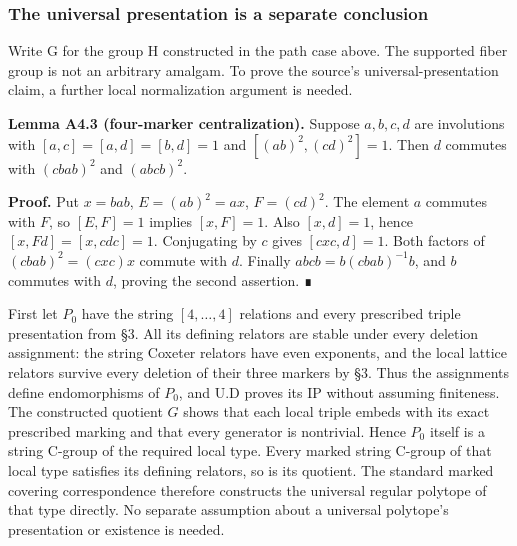 \documentclass[
  11pt,
  a4paper,
]{article}
\begin{document}
\subsubsection{The universal presentation is a separate
conclusion}\label{the-universal-presentation-is-a-separate-conclusion}

Write G for the group H constructed in the path case above. The
supported fiber group is not an arbitrary amalgam. To prove the source's
universal-presentation claim, a further local normalization argument is
needed.

\textbf{Lemma A4.3 (four-marker centralization).} Suppose \(a,b,c,d\)
are involutions with \([a,c]=[a,d]=[b,d]=1\) and \([ (ab)^2,(cd)^2]=1\).
Then \(d\) commutes with \((cbab)^2\) and \((abcb)^2\).

\textbf{Proof.} Put \(x=bab\), \(E=(ab)^2=ax\), \(F=(cd)^2\). The
element \(a\) commutes with \(F\), so \([E,F]=1\) implies \([x,F]=1\).
Also \([x,d]=1\), hence \([x,Fd]=[x,cdc]=1\). Conjugating by \(c\) gives
\([cxc,d]=1\). Both factors of \((cbab)^2=(cxc)x\) commute with \(d\).
Finally \(abcb=b(cbab)^{-1}b\), and \(b\) commutes with \(d\), proving
the second assertion. ∎

First let \(P_0\) have the string \([4,\ldots,4]\) relations and every
prescribed triple presentation from §3. All its defining relators are
stable under every deletion assignment: the string Coxeter relators have
even exponents, and the local lattice relators survive every deletion of
their three markers by §3. Thus the assignments define endomorphisms of
\(P_0\), and U.D proves its IP without assuming finiteness. The
constructed quotient \(G\) shows that each local triple embeds with its
exact prescribed marking and that every generator is nontrivial. Hence
\(P_0\) itself is a string C-group of the required local type. Every
marked string C-group of that local type satisfies its defining
relators, so is its quotient. The standard marked covering
correspondence therefore constructs the universal regular polytope of
that type directly. No separate assumption about a universal polytope's
presentation or existence is needed.
\end{document}
